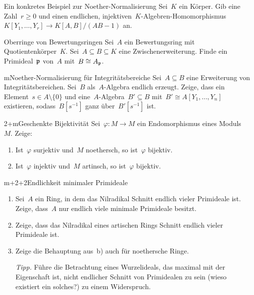 \documentclass[entwurf]{uebblatt}
\begin{document}

\begin{aufgabe}{4}{Ein konkretes Beispiel zur Noether-Normalisierung}
Sei~$K$ ein Körper. Gib eine Zahl~$r \geq 0$ und einen endlichen,
injektiven~$K$-Algebren-Homomorphismus~$K[Y_1,\ldots,Y_r] \to K[A,B]/(AB-1)$
an.
\end{aufgabe}

\begin{aufgabe}{2}{Oberringe von Bewertungsringen}
Sei~$A$ ein Bewertungsring mit Quotientenkörper~$K$. Sei~$A \subseteq B
\subseteq K$ eine Zwischenerweiterung. Finde ein Primideal~$\mathfrak{p}$ von~$A$
mit~$B \cong A_{\mathfrak{p}}$.
\end{aufgabe}

\begin{aufgabe}{m}{Noether-Normalisierung für Integritätsbereiche}
Sei~$A \subseteq B$ eine Erweiterung von Integritätsbereichen. Sei~$B$
als~$A$-Algebra endlich erzeugt. Zeige, dass ein Element~$s \in A \setminus
\{0\}$ und eine~$A$-Algebra~$B' \subseteq B$ mit~$B' \cong A[Y_1,\ldots,Y_n]$
existieren, sodass~$B[s^{-1}]$ ganz über~$B'[s^{-1}]$ ist.
\end{aufgabe}

\begin{aufgabe}{2+m}{Geschenkte Bijektivität}
Sei~$\varphi : M \to M$ ein Endomorphismus eines Moduls~$M$. Zeige:
\begin{enumerate}
\item Ist~$\varphi$ surjektiv und~$M$ noethersch, so ist~$\varphi$ bijektiv.
\item Ist~$\varphi$ injektiv und~$M$ artinsch, so ist~$\varphi$ bijektiv.
\end{enumerate}
\end{aufgabe}

\begin{aufgabe}{m+2+2}{Endlichkeit minimaler Primideale}
\begin{enumerate}
\item Sei~$A$ ein Ring, in dem das Nilradikal Schnitt endlich vieler Primideale
ist. Zeige, dass~$A$ nur endlich viele minimale Primideale besitzt.
\item Zeige, dass das Nilradikal eines artischen Rings Schnitt
endlich vieler Primideale ist.
\item Zeige die Behauptung aus~b) auch für noethersche Ringe.

{\scriptsize\emph{Tipp.} Führe die Betrachtung eines Wurzelideals, das maximal
mit der Eigenschaft ist, nicht endlicher Schnitt von Primidealen zu sein (wieso
existiert ein solches?) zu einem Widerspruch.\par}
\end{enumerate}
\end{aufgabe}
\end{document}
